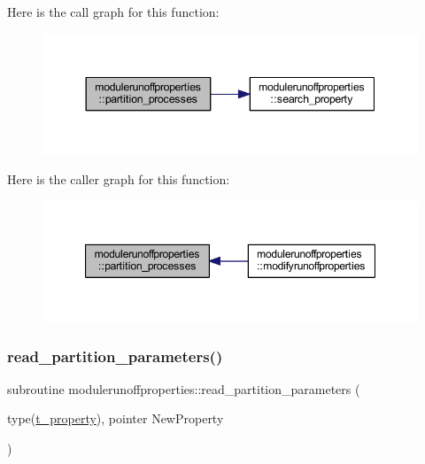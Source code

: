 Here is the call graph for this function\+:\nopagebreak
\begin{figure}[H]
\begin{center}
\leavevmode
\includegraphics[width=344pt]{namespacemodulerunoffproperties_a6a27cac0933a3a6597bcb4971c40e53b_cgraph}
\end{center}
\end{figure}
Here is the caller graph for this function\+:\nopagebreak
\begin{figure}[H]
\begin{center}
\leavevmode
\includegraphics[width=347pt]{namespacemodulerunoffproperties_a6a27cac0933a3a6597bcb4971c40e53b_icgraph}
\end{center}
\end{figure}
\mbox{\label{namespacemodulerunoffproperties_ab3fc52402148877652dc3cb453fd27be}} 
\subsubsection{\texorpdfstring{read\+\_\+partition\+\_\+parameters()}{read\_partition\_parameters()}}
{\footnotesize\ttfamily subroutine modulerunoffproperties\+::read\+\_\+partition\+\_\+parameters (\begin{DoxyParamCaption}\item[{type(\mbox{\hyperlink{structmodulerunoffproperties_1_1t__property}{t\+\_\+property}}), pointer}]{New\+Property }\end{DoxyParamCaption})\hspace{0.3cm}{\ttfamily [private]}}

